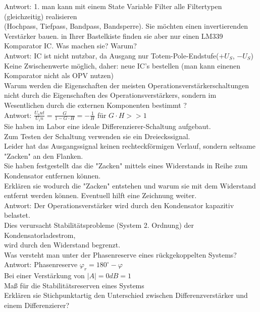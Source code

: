 \documentclass[A4]{scrartcl}
\begin{document}
  Antwort: 1. man kann mit einem State Variable Filter alle Filtertypen (gleichzeitig) realisieren\\
  \bigskip (Hochpass, Tiefpass, Bandpass, Bandsperre).
  \newpage
  Sie möchten einen invertierenden Verstärker bauen. in Ihrer Bastelkiste finden sie aber nur einen LM339 Komparator IC. Was machen sie? Warum?\\
  Antwort: IC ist nicht nutzbar, da Ausgang nur Totem-Pole-Endstufe($ +U_S$, $-U_S$)\\
  \bigskip Keine Zwischenwerte möglich, daher: neue IC's bestellen (man kann einenen Komparator nicht als OPV nutzen)\\
  Warum werden die Eigenschaften der meisten Operationsverstärkerschaltungen nicht durch die Eigenschaften des Operationsverstärkers, sondern im Wesentlichen durch die externen Komponenten bestimmt ?\\
  \bigskip Antwort: $\frac{U_out}{U_in} = \frac{G}{1-G\cdot H} = -\frac{1}{H}$ für $G\cdot H >> 1$\\
  Sie haben im Labor eine ideale Differenzierer-Schaltung aufgebaut.\\
  Zum Testen der Schaltung verwenden sie ein Dreieckssignal.\\
  Leider hat das Ausgangssignal keinen rechteckförmigen Verlauf, sondern seltsame "Zacken" an den Flanken.\\
  Sie haben festgestellt das die "Zacken" mittels eines Widerstands in Reihe zum Kondensator entfernen können.\\
  Erklären sie wodurch die "Zacken" entstehen und warum sie mit dem Widerstand entfernt werden können. Eventuell hilft eine Zeichnung weiter.\\
  Antwort: Der Operationsverstärker wird durch den Kondensator kapazitiv belastet.\\
  Dies verursacht Stabilitätsprobleme (System 2. Ordnung) der Kondensatorladestrom,\\
  \bigskip wird durch den Widerstand begrenzt.\\
  Was versteht man unter der Phasenreserve eines rückgekoppelten Systems?\\
  Antwort: Phasenreserve $ \varphi_r = 180^\circ - \varphi$\\
  Bei einer Verstärkung von $|A|=0dB=1$\\
  \bigskip Maß für die Stabilitätsreserven eines Systems\\
  Erklären sie Stichpunktartig den Unterschied zwischen Differenzverstärker und einem Differenzierer?\\
\end{document}
